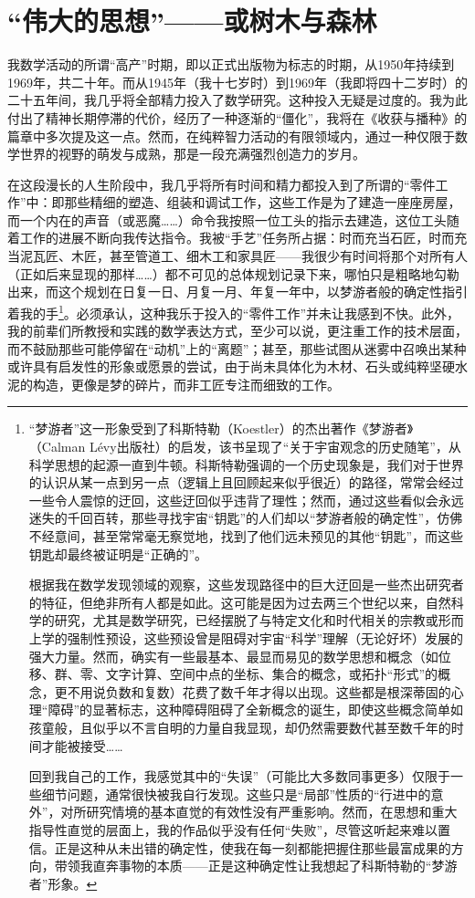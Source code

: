 \section{“伟大的思想”——或树木与森林}

我数学活动的所谓“高产”时期，即以正式出版物为标志的时期，从1950年持续到1969年，共二十年。而从1945年（我十七岁时）到1969年（我即将四十二岁时）的二十五年间，我几乎将全部精力投入了数学研究。这种投入无疑是过度的。我为此付出了精神长期停滞的代价，经历了一种逐渐的“僵化”，我将在《收获与播种》的篇章中多次提及这一点。然而，在纯粹智力活动的有限领域内，通过一种仅限于数学世界的视野的萌发与成熟，那是一段充满强烈创造力的岁月。

在这段漫长的人生阶段中，我几乎将所有时间和精力都投入到了所谓的“零件工作”中：即那些精细的塑造、组装和调试工作，这些工作是为了建造一座座房屋，而一个内在的声音（或恶魔……）命令我按照一位工头的指示去建造，这位工头随着工作的进展不断向我传达指令。我被“手艺”任务所占据：时而充当石匠，时而充当泥瓦匠、木匠，甚至管道工、细木工和家具匠——我很少有时间将那个对所有人（正如后来显现的那样……）都不可见的总体规划记录下来，哪怕只是粗略地勾勒出来，而这个规划在日复一日、月复一月、年复一年中，以梦游者般的确定性指引着我的手\footnote{“梦游者”这一形象受到了科斯特勒（Koestler）的杰出著作《梦游者》（Calman Lévy出版社）的启发，该书呈现了“关于宇宙观念的历史随笔”，从科学思想的起源一直到牛顿。科斯特勒强调的一个历史现象是，我们对于世界的认识从某一点到另一点（逻辑上且回顾起来似乎很近）的路径，常常会经过一些令人震惊的迂回，这些迂回似乎违背了理性；然而，通过这些看似会永远迷失的千回百转，那些寻找宇宙“钥匙”的人们却以“梦游者般的确定性”，仿佛不经意间，甚至常常毫无察觉地，找到了他们远未预见的其他“钥匙”，而这些钥匙却最终被证明是“正确的”。

根据我在数学发现领域的观察，这些发现路径中的巨大迂回是一些杰出研究者的特征，但绝非所有人都是如此。这可能是因为过去两三个世纪以来，自然科学的研究，尤其是数学研究，已经摆脱了与特定文化和时代相关的宗教或形而上学的强制性预设，这些预设曾是阻碍对宇宙“科学”理解（无论好坏）发展的强大力量。然而，确实有一些最基本、最显而易见的数学思想和概念（如位移、群、零、文字计算、空间中点的坐标、集合的概念，或拓扑“形式”的概念，更不用说负数和复数）花费了数千年才得以出现。这些都是根深蒂固的心理“障碍”的显著标志，这种障碍阻碍了全新概念的诞生，即使这些概念简单如孩童般，且似乎以不言自明的力量自我显现，却仍然需要数代甚至数千年的时间才能被接受……

回到我自己的工作，我感觉其中的“失误”（可能比大多数同事更多）仅限于一些细节问题，通常很快被我自行发现。这些只是“局部”性质的“行进中的意外”，对所研究情境的基本直觉的有效性没有严重影响。然而，在思想和重大指导性直觉的层面上，我的作品似乎没有任何“失败”，尽管这听起来难以置信。正是这种从未出错的确定性，使我在每一刻都能把握住那些最富成果的方向，带领我直奔事物的本质——正是这种确定性让我想起了科斯特勒的“梦游者”形象。}。必须承认，这种我乐于投入的“零件工作”并未让我感到不快。此外，我的前辈们所教授和实践的数学表达方式，至少可以说，更注重工作的技术层面，而不鼓励那些可能停留在“动机”上的“离题”；甚至，那些试图从迷雾中召唤出某种或许具有启发性的形象或愿景的尝试，由于尚未具体化为木材、石头或纯粹坚硬水泥的构造，更像是梦的碎片，而非工匠专注而细致的工作。

